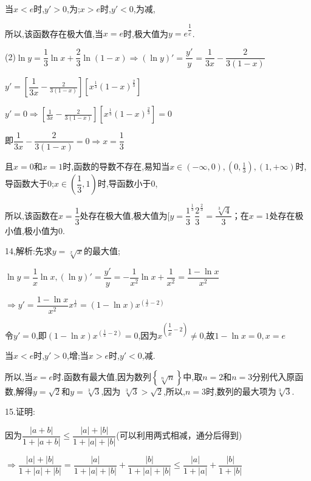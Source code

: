当$x < e$时,$y' > 0$,为;$x > e$时,$y' < 0$,为减,

所以,该函数存在极大值,当$x = e$时,极大值为$y = {e^{\dfrac{1}{e}}}$.

(2)$\ln y = \dfrac{1}{3}\ln x + \dfrac{2}{3}\ln (1 - x) \Rightarrow (\ln y)' = \dfrac{{y'}}{y} = \dfrac{1}{{3x}} - \dfrac{2}{{3(1 - x)}}$

$y' = [\dfrac{1}{{3x}} - \frac{2}{{3(1 - x)}}][{x^{\frac{1}{3}}}{(1 - x)^{\frac{2}{3}}}]$

$y' = 0 \Rightarrow [\frac{1}{{3x}} - \frac{2}{{3(1 - x)}}][{x^{\frac{1}{3}}}{(1 - x)^{\frac{2}{3}}}] = 0$

即$\dfrac{1}{{3x}} - \dfrac{2}{{3(1 - x)}} = 0 \Rightarrow x = \dfrac{1}{3}$

且$x = 0$和$x = 1$时,函数的导数不存在,易知当$x \in ( - \infty ,0),(0,\frac{1}{3}),(1, + \infty )$时,导函数大于0;$x \in (\dfrac{1}{3},1)$时,导函数小于0,

所以,该函数在$x = \dfrac{1}{3}$处存在极大值,极大值为$[y = {\dfrac{1}{3}^{\frac{1}{3}}}{\dfrac{2}{3}^{\frac{2}{3}}} = \dfrac{{\sqrt[3]{4}}}{3}$；在$x = 1$处存在极小值,极小值为0.

14,解析:先求$y = \sqrt[x]{x}$的最大值;

$\ln y = \dfrac{1}{x}\ln x,(\ln y)' = \dfrac{{y'}}{y} =  - \dfrac{1}{{{x^2}}}\ln x + \dfrac{1}{{{x^2}}} = \dfrac{{1 - \ln x}}{{{x^2}}}$

$ \Rightarrow y' = \dfrac{{1 - \ln x}}{{{x^2}}}{x^{\frac{1}{x}}} = (1 - \ln x){x^{(\frac{1}{x} - 2)}}$

令$y' = 0$,即$(1 - \ln x){x^{(\frac{1}{x} - 2)}} = 0$,因为${x^{(\dfrac{1}{x} - 2)}} \ne 0$,故$1 - \ln x = 0,x = e$

当$x < e$时,$y' > 0$,增;当$x > e$时,$y' < 0$,减.

所以,当$x = e$时.函数有最大值,因为数列$\left\{ {\sqrt[n]{n}} \right\}$中,取$n = 2$和$n = 3$分别代入原函数,解得$y = \sqrt 2 $和$y = \sqrt[3]{3}$,因为 $\sqrt[3]{3} > \sqrt 2 $,所以,$n = 3$时,数列的最大项为$\sqrt[3]{3}$.

15.证明:

因为$\dfrac{{\left| {a + b} \right|}}{{1 + \left| {a + b} \right|}} \le \dfrac{{\left| a \right| + \left| b \right|}}{{1 + \left| a \right| + \left| b \right|}}$(可以利用两式相减，通分后得到)

$ \Rightarrow \dfrac{{\left| a \right| + \left| b \right|}}{{1 + \left| a \right| + \left| b \right|}} = \dfrac{{\left| a \right|}}{{1 + \left| a \right| + \left| b \right|}} + \dfrac{{\left| b \right|}}{{1 + \left| a \right| + \left| b \right|}} \le \dfrac{{\left| a \right|}}{{1 + \left| a \right|}} + \dfrac{{\left| b \right|}}{{1 + \left| b \right|}}$

